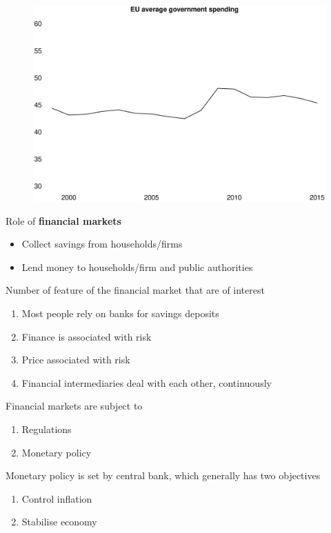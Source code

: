 \documentclass{beamer}
\begin{document}
\begin{frame}
  \begin{figure}
    \includegraphics[scale=.25]{eu_G.eps}
  \end{figure}
\end{frame}

\begin{frame}
  Role of \textbf{financial markets}
  \begin{itemize}
     \item Collect savings from households/firms
     \item Lend money to households/firm and public authorities
   \end{itemize} 
   \medskip
   Number of feature of the financial market that are of interest
  \begin{enumerate}
    \item Most people rely on banks for savings deposits
    \item Finance is associated with risk
    \item Price associated with risk
    \item Financial intermediaries deal with each other, continuously    
  \end{enumerate}
\end{frame}

\begin{frame}
  Financial markets are subject to 
  \begin{enumerate}
    \item Regulations
    \item Monetary policy
  \end{enumerate}
  \medskip
  Monetary policy is set by central bank, which generally has two objectives
  \medskip
  \begin{enumerate}
    \item Control inflation
    \item Stabilise economy
  \end{enumerate}  
\end{frame}
\end{document}
